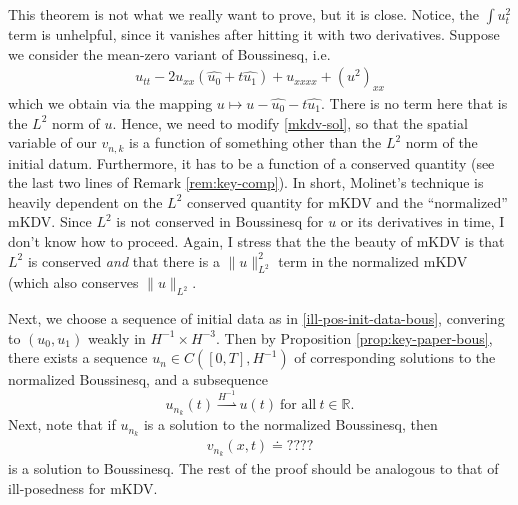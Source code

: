 \documentclass[12pt,reqno]{amsart}
\numberwithin{equation}{section}  %
\newcommand{\rr}{\mathbb{R}}
\newcommand{\wh}{\widehat}
\newtheorem{remark}[theorem]{Remark}
\begin{document}
%
%
%
%
\begin{framed}
  This theorem is not what we really want to prove, but it is close.
  Notice, the $\int u_{t}^{2}$ term is unhelpful, since it vanishes after hitting it
  with two derivatives. Suppose we consider the mean-zero variant of Boussinesq,
  i.e.
  \begin{equation*}
  \begin{split}
    u_{tt} - 2 u_{xx}(\wh{u_{0}} + t \wh{u_{1}}) + u_{xxxx} + (u^{2})_{xx}
  \end{split}
  \end{equation*}
  which we obtain via the mapping $u \mapsto u - \wh{u_{0}} - t \wh{u_{1}}.$
  There is no term here that is the $L^{2}$ norm of $u$. Hence, we need to
  modify \eqref{mkdv-sol}, so that the spatial variable of our $v_{n,k}$ is a
  function of something other than the $L^{2}$ norm of the initial datum.
  Furthermore, it has to be a function of a conserved quantity (see the last two
  lines of Remark \ref{rem:key-comp}). In short, Molinet's technique is heavily
  dependent on the $L^{2}$ conserved quantity for mKDV and the ``normalized''
  mKDV. Since $L^{2}$ is not conserved in Boussinesq for $u$ or its derivatives
  in time, I don't know how to proceed. Again, I stress that the the beauty of mKDV is
  that $L^{2}$ is conserved \emph{and} that there is a $\| u
  \|_{L^{2}}^{2}$ term in the normalized mKDV (which also conserves
  $\|u\|_{L^{2}}$.
\end{framed}
%
%
%
%
%
%
%
%
%
%
Next, we choose a sequence of initial data as in \eqref{ill-pos-init-data-bous},
convering to $(u_{0}, u_{1})$ weakly in $H^{-1} \times H^{-3}$.  
Then by Proposition \ref{prop:key-paper-bous}, there exists a sequence
$u_{n} \in C([0,T], H^{-1})$ of corresponding solutions to the normalized Boussinesq, and
a subsequence 
\begin{equation*}
  u_{n_{k}}(t) \overset{H^{-1}}{\rightharpoonup} u(t) \ \text{for
all} \ t \in \rr.
\end{equation*}
Next, note that if $u_{n_{k}}$ is a solution to the
normalized Boussinesq, then  
%
\begin{equation}
  \label{bous-sol}
\begin{split}
  v_{n_{k}}(x,t) \doteq ????
\end{split}
\end{equation}
%
%
is a solution to Boussinesq. The rest of the proof should be analogous to that
of ill-posedness for mKDV.
%
%
    
\end{document}
